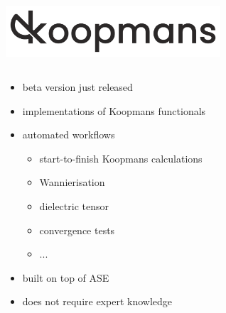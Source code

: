 \documentclass[xcolor=table,aspectratio=169]{beamer}
\numberwithin{equation}{section}
\begin{document}
\begin{frame}{}
   \begin{center}
      \includegraphics[width=0.6\textwidth]{figures/koopmans_grey_on_transparent.png}
   \end{center}

   \vspace{-2ex}

   \begin{columns}
      \begin{column}{0.55\textwidth}
         \begin{itemize}
            \item beta version just released\footnotemark[1]
            \item implementations of Koopmans functionals
            \item automated workflows
                  \begin{itemize}
                     \item start-to-finish Koopmans calculations
                     \item Wannierisation
                     \item dielectric tensor
                     \item convergence tests
                     \item ...
                  \end{itemize}
            \item built on top of ASE\footnotemark[2]
            \item does not require expert knowledge
         \end{itemize}
      \end{column}


\end{columns}
\end{frame}
\end{document}
